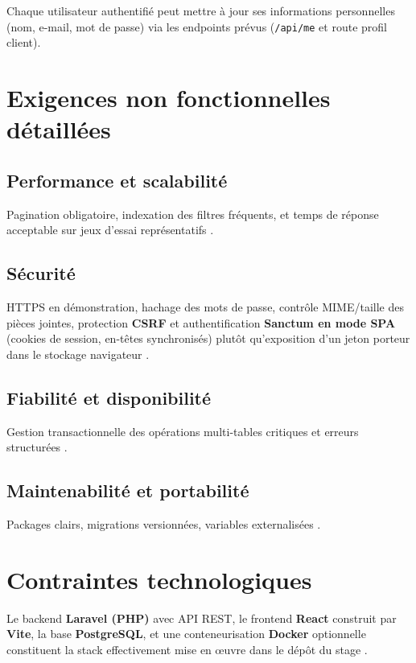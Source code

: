 Chaque utilisateur authentifié peut mettre à jour ses informations personnelles (nom, e-mail, mot de passe) via les endpoints prévus (\texttt{/api/me} et route profil client).

\section{Exigences non fonctionnelles détaillées}

\subsection{Performance et scalabilité}

Pagination obligatoire, indexation des filtres fréquents, et temps de réponse acceptable sur jeux d'essai représentatifs \cite{kleppmann2017,postgresdoc}.

\subsection{Sécurité}

HTTPS en démonstration, hachage des mots de passe, contrôle MIME/taille des pièces jointes, protection \textbf{CSRF} et authentification \textbf{Sanctum en mode SPA} (cookies de session, en-têtes synchronisés) plutôt qu'exposition d'un jeton porteur dans le stockage navigateur \cite{sanctumdoc,owasp2021}.

\subsection{Fiabilité et disponibilité}

Gestion transactionnelle des opérations multi-tables critiques et erreurs structurées \cite{sommerville2016}.

\subsection{Maintenabilité et portabilité}

Packages clairs, migrations versionnées, variables externalisées \cite{fowler2002,dockerdoc}.

\section{Contraintes technologiques}

Le backend \textbf{Laravel (PHP)} avec API REST, le frontend \textbf{React} construit par \textbf{Vite}, la base \textbf{PostgreSQL}, et une conteneurisation \textbf{Docker} optionnelle constituent la stack effectivement mise en œuvre dans le dépôt du stage \cite{laraveldoc,reactdoc,vitedoc,postgresdoc,dockerdoc}.

